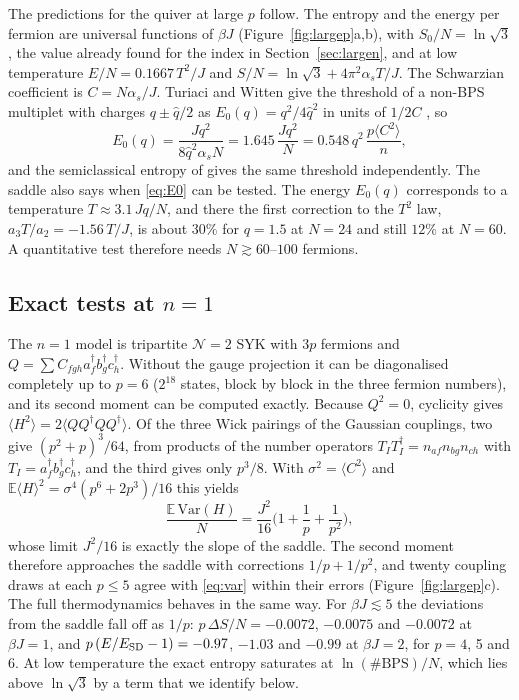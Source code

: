 \documentclass[10pt]{article}
\begin{document}
The predictions for the quiver at large $p$ follow. The entropy and the energy per fermion are universal functions of
$\beta J$ (Figure~\ref{fig:largep}a,b), with $S_0/N=\ln\sqrt3$, the value already found for the index in
Section~\ref{sec:largen}, and at low temperature $E/N=0.1667\,T^2/J$ and $S/N=\ln\sqrt3+4\pi^2\alpha_sT/J$. The
Schwarzian coefficient is $C=N\alpha_s/J$. Turiaci and Witten give the threshold of a non-BPS multiplet with charges
$q\pm\hat q/2$ as $E_0(q)=q^2/4\hat q^2$ in units of $1/2C$ \cite{TW}, so
\begin{equation}
E_0(q)=\frac{Jq^2}{8\hat q^2\alpha_sN}=1.645\,\frac{Jq^2}N=0.548\,q^2\,\frac{p\langle C^2\rangle}{n},
\label{eq:E0}
\end{equation}
and the semiclassical entropy of \cite{FGMS} gives the same threshold independently. The saddle also says when
\eqref{eq:E0} can be tested. The energy $E_0(q)$ corresponds to a temperature $T\approx3.1\,Jq/N$, and there the
first correction to the $T^2$ law, $a_3T/a_2=-1.56\,T/J$, is about $30\%$ for $q=1.5$ at $N=24$ and still $12\%$ at
$N=60$. A quantitative test therefore needs $N\gtrsim60$--$100$ fermions.

\subsection{\texorpdfstring{Exact tests at $n=1$}{Exact tests at n=1}}

The $n=1$ model is tripartite $\mathcal N=2$ SYK with $3p$ fermions and $Q=\sum C_{fgh}a_f^\dagger b_g^\dagger c_h^\dagger$.
Without the gauge projection it can be diagonalised completely up to $p=6$ ($2^{18}$ states, block by block in the
three fermion numbers), and its second moment can be computed exactly. Because $Q^2=0$, cyclicity gives
$\langle H^2\rangle=2\langle QQ^\dagger QQ^\dagger\rangle$. Of the three Wick pairings of the Gaussian couplings, two
give $(p^2+p)^3/64$, from products of the number operators $T_IT_I^\dagger=n_{af}n_{bg}n_{ch}$ with
$T_I=a_f^\dagger b_g^\dagger c_h^\dagger$, and the third gives only $p^3/8$. With $\sigma^2=\langle C^2\rangle$ and
$\mathbb E\langle H\rangle^2=\sigma^4(p^6+2p^3)/16$ this yields
\begin{equation}
\frac{\mathbb E\,\mathrm{Var}(H)}N=\frac{J^2}{16}\Big(1+\frac1p+\frac1{p^2}\Big),
\label{eq:var}
\end{equation}
whose limit $J^2/16$ is exactly the slope of the saddle. The second moment therefore approaches the saddle with
corrections $1/p+1/p^2$, and twenty coupling draws at each $p\le5$ agree with \eqref{eq:var} within their errors
(Figure~\ref{fig:largep}c). The full thermodynamics behaves in the same way. For $\beta J\lesssim5$ the deviations
from the saddle fall off as $1/p$: $p\,\Delta S/N=-0.0072$, $-0.0075$ and $-0.0072$ at $\beta J=1$, and
$p\,(E/E_{\rm SD}-1)=-0.97$, $-1.03$ and $-0.99$ at $\beta J=2$, for $p=4$, 5 and 6. At low temperature the exact
entropy saturates at $\ln(\#\mathrm{BPS})/N$, which lies above $\ln\sqrt3$ by a term that we identify below.
\end{document}
